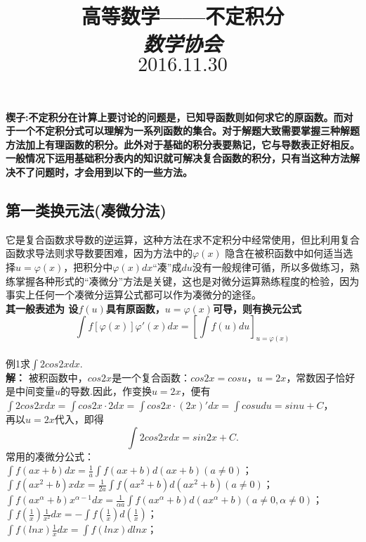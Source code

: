 \documentclass[UTF8]{ctexart}
\date{}
\title{\textbf{\small 高等数学——不定积分 \\  \emph{数学协会}\\$2016.11.30$}}
\begin{document}
\maketitle
\thispagestyle{fancy}
\vspace{-20mm} \textbf{\small 楔子:不定积分在计算上要讨论的问题是，已知导函数则如何求它的原函数。而对于一个不定积分式可以理解为一系列函数的集合。对于解题大致需要掌握三种解题方法加上有理函数的积分。此外对于基础的积分表要熟记，它与导数表正好相反。一般情况下运用基础积分表内的知识就可解决复合函数的积分，只有当这种方法解决不了问题时，才会用到以下的一些方法。}
\vspace{-6mm} \subsection{第一类换元法(凑微分法)} \vspace{-2mm} \small 它是复合函数求导数的逆运算，这种方法在求不定积分中经常使用，但比利用复合函数求导法则求导数要困难，因为方法中的$\varphi (x)$ 隐含在被积函数中如何适当选择$u=\varphi (x)$，把积分中$\varphi (x) dx$“凑”成$du$没有一般规律可循，所以多做练习，熟练掌握各种形式的“凑微分”方法是关键，这也是对微分运算熟练程度的检验，因为事实上任何一个凑微分运算公式都可以作为凑微分的途径。
\\ \textbf{其一般表述为 设$f(u)$具有原函数，$u=\varphi (x)$可导，则有换元公式$$\int f[\varphi (x)]\varphi '(x)dx=[\int f(u)du]_{u=\varphi (x)}$$}\vspace{-2mm}
\\  例1\quad  求$  \displaystyle{\int 2cos2x dx}$.
\\ \textbf{解：} 被积函数中，$cos2x$是一个复合函数：$cos2x=cosu$，$u=2x$，常数因子恰好是中间变量$u$的导数.因此，作变换$u=2x$，便有
\\ $ \displaystyle{\int 2cos2xdx=\int cos2x\cdot 2dx=\int cos2x \cdot(2x)' dx=\int cosudu =sinu+C}$，
\\ 再以$u=2x$代入，即得$$\int 2cos2xdx=sin2x+C.$$
常用的凑微分公式：
\\$\displaystyle{\int f(ax+b)dx}=\frac{1}{a}\displaystyle{\int f(ax+b)d(ax+b)(a\neq 0)}$；
\quad \quad\quad\quad\quad\quad\quad\quad\quad$\displaystyle{\int f(ax^2+b)xdx=\frac{1}{2a} \int f(ax^2+b)d(ax^2+b)}(a \neq 0)$；
\\ $\displaystyle{\int f(ax^\alpha +b)x^{\alpha-1}dx=\frac{1}{\alpha a}\int f(ax^\alpha +b)d(ax^\alpha +b)(a \neq0,\alpha \neq 0)}$；
\quad $\displaystyle{\int f(\frac{1}{x})\frac{1}{x^2}dx=-\int f(\frac{1}{x})d(\frac{1}{x})}$；
\\ $\displaystyle{\int f(lnx)\frac{1}{x}dx=\int f(lnx)dlnx}$；
\end{document}
